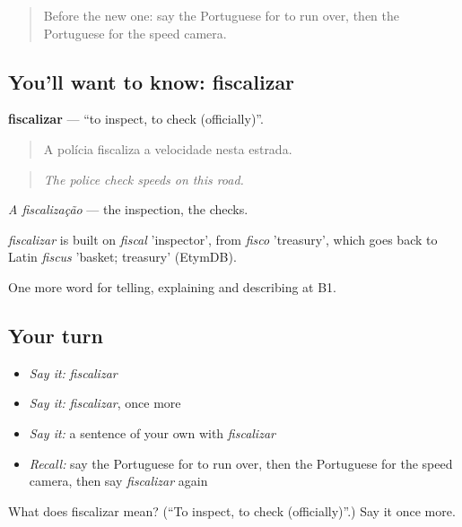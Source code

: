\label{lesson:PT-C408-fiscalizar}



\begin{quote}
Before the new one: say the Portuguese for to run over, then the Portuguese for the speed camera.
\end{quote}

\subsection*{You'll want to know: fiscalizar}
\textbf{fiscalizar} — \textquotedblleft{}to inspect, to check (officially)\textquotedblright{}.

\begin{quote}
A polícia fiscaliza a velocidade nesta estrada.
\end{quote}

\begin{quote}
\emph{The police check speeds on this road.}
\end{quote}

\emph{A fiscalização} — the inspection, the checks.

\begin{cousinweb}
\emph{fiscalizar} is built on \emph{fiscal} 'inspector', from \emph{fisco} 'treasury', which goes back to Latin \emph{fiscus} 'basket; treasury' (EtymDB).
\end{cousinweb}

\begin{grammarlens}[title={What you've built}]
One more word for telling, explaining and describing at B1.
\end{grammarlens}

\subsection*{Your turn}
\begin{itemize}
\raggedright
  \item \emph{Say it:} \emph{fiscalizar}
  \item \emph{Say it:} \emph{fiscalizar}, once more
  \item \emph{Say it:} a sentence of your own with \emph{fiscalizar}
  \item \emph{Recall:} say the Portuguese for to run over, then the Portuguese for the speed camera, then say \emph{fiscalizar} again
\end{itemize}

\begin{tcolorbox}[breakable,colback=teal!4,colframe=teal!35!black,title={Before you move on}]
What does fiscalizar mean? (\textquotedblleft{}To inspect, to check (officially)\textquotedblright{}.) Say it once more.
\end{tcolorbox}
